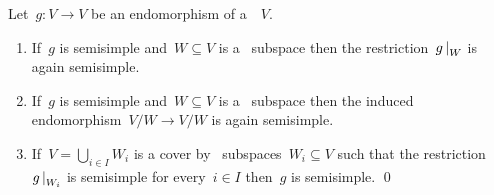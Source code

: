 \begin{lemma}
  \label{properties of ss endomorphisms}
  Let~$g \colon V \to V$ be an endomorphism of a~~$V$.
  \begin{enumerate}
    \item
      \label{restrictions again semisimple}
      If~$g$ is semisimple and~$W \subseteq V$ is a~ subspace then the restriction~$\restrict{g}{W}$ is again semisimple.
    \item
      If~$g$ is semisimple and~$W \subseteq V$ is a~ subspace then the induced endomorphism~$V/W \to V/W$ is again semisimple.
    \item
      \label{semisimple via sum covering}
        If~$V = \bigcup_{i \in I} W_i$ is a cover by~ subspaces~$W_i \subseteq V$ such that the restriction~$\restrict{g}{W_i}$ is semisimple for every~$i \in I$ then~$g$ is semisimple.
    \qed
  \end{enumerate}
\end{lemma}




